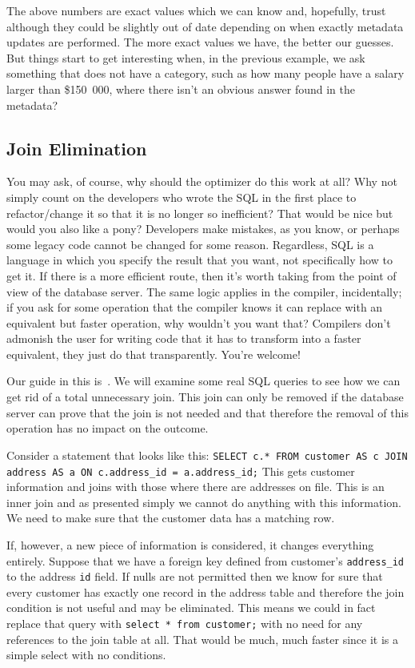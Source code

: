 \documentclass[a4paper]{report}
\begin{document}
The above numbers are exact values which we can know and, hopefully, trust although they could be slightly out of date depending on when exactly metadata updates are performed. The more exact values we have, the better our guesses. But things start to get interesting when, in the previous example, we ask something that does not have a category, such as how many people have a salary larger than \$150~000, where there isn't an obvious answer found in the metadata?

\subsection*{Join Elimination}

You may ask, of course, why should the optimizer do this work at all? Why not simply count on the developers who wrote the SQL in the first place to refactor/change it so that it is no longer so inefficient? That would be nice but would you also like a pony?  Developers make mistakes, as you know, or perhaps some legacy code cannot be changed for some reason. Regardless, SQL is a language in which you specify the result that you want, not specifically how to get it. If there is a more efficient route, then it's worth taking from the point of view of the database server. The same logic applies in the compiler, incidentally; if you ask for some operation that the compiler knows it can replace with an equivalent but faster operation, why wouldn't you want that? Compilers don't admonish the user for writing code that it has to transform into a faster equivalent, they just do that transparently. You're welcome!

Our guide in this is~\cite{joinelim}. We will examine some real SQL queries to see how we can get rid of a total unnecessary join. This join can only be removed if the database server can prove that the join is not needed and that therefore the removal of this operation has no impact on the outcome.


Consider a statement that looks like this: \texttt{SELECT c.* FROM customer AS c JOIN address AS a ON c.address\_id = a.address\_id;} This gets customer information and joins with those where there are addresses on file. This is an inner join and as presented simply we cannot do anything with this information. We need to make sure that the customer data has a matching row.

If, however, a new piece of information is considered, it changes everything entirely. Suppose that we have a foreign key defined from customer's \texttt{address\_id} to the address \texttt{id} field. If nulls are not permitted then we know for sure that every customer has exactly one record in the address table and therefore the join condition is not useful and may be eliminated. This means we could in fact replace that query with \texttt{select * from customer;} with no need for any references to the join table at all. That would be much, much faster since it is a simple select with no conditions.
\end{document}
